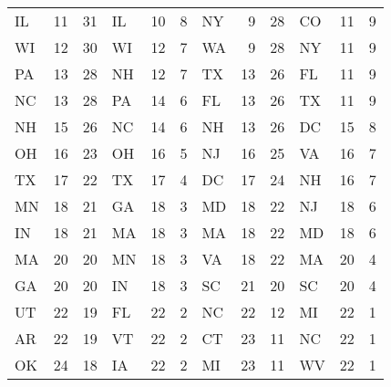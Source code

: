 \begin{longtable}{lrr|lrr||lrr|lrr}
        IL &   11 &            31 &            IL &   10 &             8 &             NY &    9 &            28 &            CO &   11 &             9 \\
        WI &   12 &            30 &            WI &   12 &             7 &             WA &    9 &            28 &            NY &   11 &             9 \\
        PA &   13 &            28 &            NH &   12 &             7 &             TX &   13 &            26 &            FL &   11 &             9 \\
        NC &   13 &            28 &            PA &   14 &             6 &             FL &   13 &            26 &            TX &   11 &             9 \\
        NH &   15 &            26 &            NC &   14 &             6 &             NH &   13 &            26 &            DC &   15 &             8 \\
        OH &   16 &            23 &            OH &   16 &             5 &             NJ &   16 &            25 &            VA &   16 &             7 \\
        TX &   17 &            22 &            TX &   17 &             4 &             DC &   17 &            24 &            NH &   16 &             7 \\
        MN &   18 &            21 &            GA &   18 &             3 &             MD &   18 &            22 &            NJ &   18 &             6 \\
        IN &   18 &            21 &            MA &   18 &             3 &             MA &   18 &            22 &            MD &   18 &             6 \\
        MA &   20 &            20 &            MN &   18 &             3 &             VA &   18 &            22 &            MA &   20 &             4 \\
        GA &   20 &            20 &            IN &   18 &             3 &             SC &   21 &            20 &            SC &   20 &             4 \\
        UT &   22 &            19 &            FL &   22 &             2 &             NC &   22 &            12 &            MI &   22 &             1 \\
        AR &   22 &            19 &            VT &   22 &             2 &             CT &   23 &            11 &            NC &   22 &             1 \\
        OK &   24 &            18 &            IA &   22 &             2 &             MI &   23 &            11 &            WV &   22 &             1 \\

\end{longtable}
